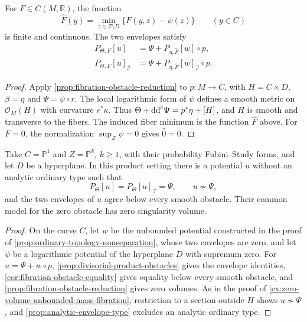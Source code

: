 \begin{proposition}\label{prop:divisorial-product-obstacles}
For $F\in C(M,\mathbb R)$, the function
\[
 \widehat F(y)=\min_{z\in Z\setminus D}\{F(y,z)-\psi(z)\}
 \qquad(y\in C)
\]
is finite and continuous. The two envelopes satisfy
\begin{equation}\label{eq:divisorial-product-obstacles}
 \begin{split}
 P_{\Theta,F}[u]&=\Psi+P_{\eta,\widehat F}[w]\circ p,\\
 P_{\Theta,F}[u]_{\mathcal I}
     &=\Psi+P_{\eta,\widehat F}[w]_{\mathcal I}\circ p.
 \end{split}
\end{equation}
\end{proposition}
\begin{proof}
Apply \cref{prop:fibration-obstacle-reduction} to $p\colon M\to C$, with $H=C\times D$, $\beta=\eta$ and $\Psi=\psi\circ r$. The local logarithmic form of $\psi$ defines a smooth metric on $\mathcal O_M(H)$ with curvature $r^*\kappa$. Thus $\Theta+\mathrm{dd}^{\mathrm{c}}\Psi=p^*\eta+[H]$, and $H$ is smooth and transverse to the fibers. The induced fiber minimum is the function $\widehat F$ above. For $F=0$, the normalization $\sup_Z\psi=0$ gives $\widehat 0=0$.
\end{proof}

\begin{example}\label{ex:zero-volume-nonanalytic-product}
Take $C=\mathbb P^1$ and $Z=\mathbb P^k$, $k\geq1$, with their probability Fubini--Study forms, and let $D$ be a hyperplane. In this product setting there is a potential $u$ without an analytic ordinary type such that
\[
 P_\Theta[u]=P_\Theta[u]_{\mathcal I}=\Psi,
 \qquad u\not\sim\Psi,
\]
and the two envelopes of $u$ agree below every smooth obstacle. Their common model for the zero obstacle has zero singularity volume.
\end{example}
\begin{proof}
On the curve $C$, let $w$ be the unbounded potential constructed in the proof of \cref{prop:ordinary-topology-nonseparation}, whose two envelopes are zero, and let $\psi$ be a logarithmic potential of the hyperplane $D$ with supremum zero. For $u=\Psi+w\circ p$, \cref{prop:divisorial-product-obstacles} gives the envelope identities, \cref{cor:fibration-obstacle-equality} gives equality below every smooth obstacle, and \cref{prop:fibration-obstacle-reduction} gives zero volumes. As in the proof of \cref{ex:zero-volume-unbounded-mass-fibration}, restriction to a section outside $H$ shows $u\not\sim\Psi$, and \cref{prop:analytic-envelope-type} excludes an analytic ordinary type.
\end{proof}

